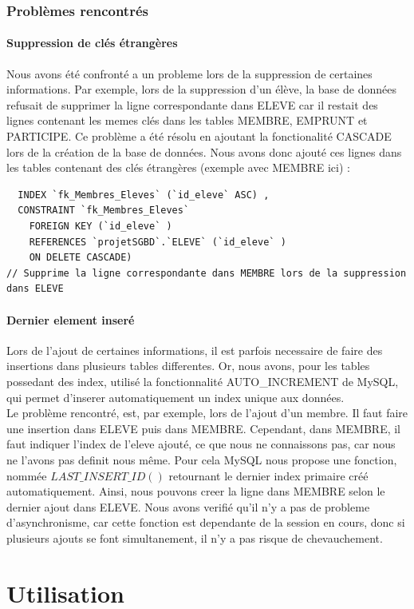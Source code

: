 \documentclass[a4paper, 11pt]{article}
\begin{document}
\section{Problèmes rencontrés}
\subsection{Suppression de clés étrangères}
Nous avons été confronté a un probleme lors de la suppression de certaines informations. Par exemple, lors de la suppression d'un élève, la base de données refusait de supprimer la ligne correspondante dans ELEVE car il restait des lignes contenant les memes clés dans les tables MEMBRE, EMPRUNT et PARTICIPE. Ce problème a été résolu en ajoutant la fonctionalité CASCADE lors de la création de la base de données. Nous avons donc ajouté ces lignes dans les tables contenant des clés étrangères (exemple avec MEMBRE ici) :
\begin{verbatim}
  INDEX `fk_Membres_Eleves` (`id_eleve` ASC) ,
  CONSTRAINT `fk_Membres_Eleves`
    FOREIGN KEY (`id_eleve` )
    REFERENCES `projetSGBD`.`ELEVE` (`id_eleve` )
    ON DELETE CASCADE)  
// Supprime la ligne correspondante dans MEMBRE lors de la suppression dans ELEVE
\end{verbatim}
\subsection{Dernier element inseré}
Lors de l'ajout de certaines informations, il est parfois necessaire de faire des insertions dans plusieurs tables differentes. Or, nous avons, pour les tables possedant des index, utilisé la fonctionnalité AUTO\_INCREMENT de MySQL, qui permet d'inserer automatiquement un index unique aux données. 
\\Le problème rencontré, est, par exemple, lors de l'ajout d'un membre. Il faut faire une insertion dans ELEVE puis dans MEMBRE. Cependant, dans MEMBRE, il faut indiquer l'index de l'eleve ajouté, ce que nous ne connaissons pas, car nous ne l'avons pas definit nous même. Pour cela MySQL nous propose une fonction, nommée $LAST\_INSERT\_ID()$ retournant le dernier index primaire créé automatiquement. Ainsi, nous pouvons creer la ligne dans MEMBRE selon le dernier ajout dans ELEVE. Nous avons verifié qu'il n'y a pas de probleme d'asynchronisme, car cette fonction est dependante de la session en cours, donc si plusieurs ajouts se font simultanement, il n'y a pas risque de chevauchement.

\newpage
\part{Utilisation}
\setcounter{section}{0}
\end{document}
